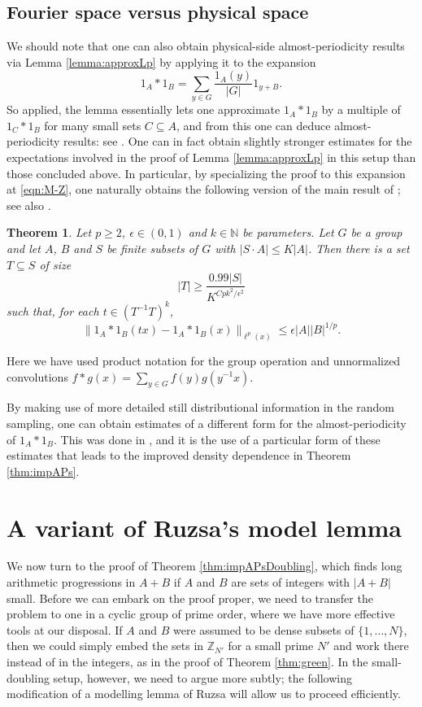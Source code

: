 \documentclass[12pt,a4paper,reqno]{amsart}
\numberwithin{equation}{section}
\theoremstyle{plain}
\newtheorem{theorem}[subsection]{Theorem}
\theoremstyle{definition}
\renewcommand{\leq}{\leqslant}
\renewcommand{\geq}{\geqslant}
\renewcommand{\subset}{\subseteq}
\def\Z{\mathbb{Z}}
\def\N{\mathbb{N}}
\newcommand{\Zmod}[1]{\Z_{#1}} %
\providecommand{\abs}[1]{\lvert#1\rvert}
\providecommand{\norm}[1]{\lVert #1 \rVert}
\theoremstyle{plain}
\begin{document}
\subsection*{Fourier space versus physical space}
We should note that one can also obtain physical-side almost-periodicity results via Lemma \ref{lemma:approxLp} by applying it to the expansion
\[ 1_A*1_B = \sum_{y \in G} \frac{1_A(y)}{\abs{G}} 1_{y+B}. \]
So applied, the lemma essentially lets one approximate $1_A*1_B$ by a multiple of $1_C*1_B$ for many small sets $C \subset A$, and from this one can deduce almost-periodicity results: see \cite{croot-sisask}. One can in fact obtain slightly stronger estimates for the expectations involved in the proof of Lemma \ref{lemma:approxLp} in this setup than those concluded above. In particular, by specializing the proof to this expansion at \eqref{eqn:M-Z}, one naturally obtains the following version of the main result of \cite{croot-sisask}; see also \cite[Lemma 3.3]{sanders:bogolyubov}.

\begin{theorem}\label{thm:plain_lp}
Let $p \geq 2$, $\epsilon \in (0,1)$ and $k \in \N$ be parameters. Let $G$ be a group and let $A$, $B$ and $S$ be finite subsets of $G$ with $\abs{S\cdot A} \leq K\abs{A}$. Then there is a set $T \subset S$ of size
\[ \abs{T} \geq \frac{0.99\abs{S}}{K^{C p k^2/\epsilon^2}} \]
such that, for each $t \in (T^{-1}T)^k$,
\[ \norm{ 1_A*1_B(tx) - 1_A*1_B(x) }_{\ell^p(x)} \leq \epsilon \abs{A} \abs{B}^{1/p}. \]
\end{theorem}

Here we have used product notation for the group operation and unnormalized convolutions $f*g(x) = \sum_{y\in G} f(y)g(y^{-1}x)$.

By making use of more detailed still distributional information in the random sampling, one can obtain estimates of a different form for the almost-periodicity of $1_A*1_B$. This was done in \cite{croot-sisask}, and it is the use of a particular form of these estimates that leads to the improved density dependence in Theorem \ref{thm:impAPs}.


\section{A variant of Ruzsa's model lemma}\label{section:model}
We now turn to the proof of Theorem \ref{thm:impAPsDoubling}, which finds long arithmetic progressions in $A+B$ if $A$ and $B$ are sets of integers with $\abs{A+B}$ small. Before we can embark on the proof proper, we need to transfer the problem to one in a cyclic group of prime order, where we have more effective tools at our disposal. If $A$ and $B$ were assumed to be dense subsets of $\{1,\ldots,N\}$, then we could simply embed the sets in $\Zmod{N'}$ for a small prime $N'$ and work there instead of in the integers, as in the proof of Theorem \ref{thm:green}. In the small-doubling setup, however, we need to argue more subtly; the following modification of a modelling lemma of Ruzsa \cite[Theorem 2.3.5]{ruzsa:sumsets_structure} will allow us to proceed efficiently.
\end{document}
